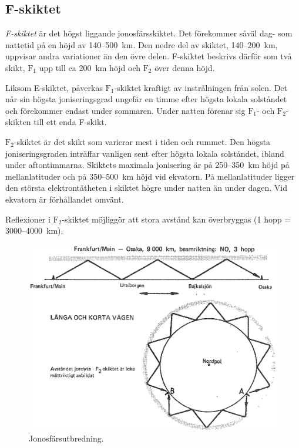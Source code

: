 \subsection{F-skiktet}

\emph{F-skiktet} är det högst liggande jonosfärsskiktet.
Det förekommer såväl dag- som nattetid på en höjd av 140--500~km.
Den nedre del av skiktet, 140--200~km, uppvisar andra variationer än den övre
delen.
F-skiktet beskrivs därför som två skikt, \(\mathrm{F_1}\) upp till ca 200~km
höjd och \(\mathrm{F_2}\) över denna höjd.

Liksom E-skiktet, påverkas \(\mathrm{F_1}\)-skiktet kraftigt av
instrålningen från solen.
Det når sin högsta joniseringsgrad ungefär en timme efter högsta lokala
solståndet och förekommer endast under sommaren.
Under natten förenar sig \(\mathrm{F_1}\)- och \(\mathrm{F_2}\)-skikten till
ett enda F-skikt.

\(\mathrm{F_2}\)-skiktet är det skikt som varierar mest i tiden och rummet.
Den högsta joniseringsgraden inträffar vanligen sent efter högsta lokala
solståndet, ibland under aftontimmarna.
Skiktets maximala jonisering är på 250--350~km höjd på mellanlatituder och på
350--500~km höjd vid ekvatorn.
På mellanlatituder ligger den största elektrontätheten i skiktet högre under
natten än under dagen.
Vid ekvatorn är förhållandet omvänt.

Reflexioner i \(\mathrm{F_2}\)-skiktet möjliggör att stora
avstånd kan överbryggas (1 hopp = 3000--4000~km).

\begin{figure}
  \includegraphics[width=\textwidth]{images/cropped_pdfs/bild_2_7-08.pdf}
  \caption{Jonosfärsutbredning.}
  \label{fig:bildII7-8}
\end{figure}

